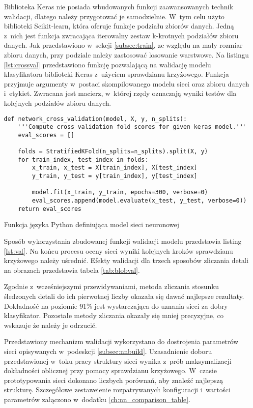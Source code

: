 Biblioteka Keras nie posiada wbudowanych funkcji zaawansowanych technik
walidacji, dlatego należy przygotować je samodzielnie.
W~tym celu użyto biblioteki Scikit-learn, która oferuje funkcje podziału
zbiorów danych.
Jedną z~nich jest funkcja zwracająca iterowalny zestaw k-krotnych
podziałów zbioru danych.
Jak przedstawiono w~sekcji \ref{subsec:train}, ze względu na mały rozmiar
zbioru danych, przy podziale należy zastosować losowanie warstwowe.
Na listingu \ref{lst:crossval} przedstawiono funkcję pozwalającą na walidację
modelu klasyfikatora biblioteki Keras z~użyciem sprawdzianu krzyżowego.
Funkcja przyjmuje argumenty w~postaci skompilowanego modelu sieci oraz
zbioru danych i~etykiet.
Zwracana jest macierz, w~której rzędy oznaczają wyniki testów dla kolejnych
podziałów zbioru danych.
\begin{listing}[htb]
\begin{verbatim}
def network_cross_validation(model, X, y, n_splits):
    '''Compute cross validation fold scores for given keras model.'''
    eval_scores = []

    folds = StratifiedKFold(n_splits=n_splits).split(X, y)
    for train_index, test_index in folds:
        x_train, x_test = X[train_index], X[test_index]
        y_train, y_test = y[train_index], y[test_index]

        model.fit(x_train, y_train, epochs=300, verbose=0)
        eval_scores.append(model.evaluate(x_test, y_test, verbose=0))
    return eval_scores
\end{verbatim}
\caption{Funkcja języka Python definiująca model sieci neuronowej}
\label{lst:crossval}
\end{listing}
Sposób wykorzystania zbudowanej funkcji walidacji modelu przedstawia
listing \ref{lst:val}.
Na końcu procesu oceny sieci wyniki kolejnych kroków sprawdzianu krzyżowego
należy uśrednić.
Efekty walidacji dla trzech sposobów zliczania detali na obrazach przedstawia
tabela \ref{tab:blobval}.

Zgodnie z~wcześniejszymi przewidywaniami, metoda zliczania stosunku śledzonych
detali do ich pierwotnej liczby okazała się dawać najlepsze rezultaty.
Dokładność na poziomie 91\% jest wystarczająca do uznania sieci za dobry
klasyfikator.
Pozostałe metody zliczania okazały się mniej precyzyjne, co wskazuje że należy
je odrzucić.

Przedstawiony mechanizm walidacji wykorzystano do dostrojenia parametrów
sieci opisywanych w~podeskcji \ref{subsec:nnbuild}.
Uzasadnienie doboru przedstawionej w~toku pracy struktury sieci wynika z~prób
maksymalizacji dokładności oblicznej przy pomocy sprawdzianu krzyżowego.
W~czasie prototypowania sieci dokonano liczbych porównań, aby znaleźć
najlepszą strukturę.
Szczegółowe zestaweienie rozpatrywanych konfiguracji i~wartości parametrów
załączono w~dodatku \ref{ch:nn_comparison_table}.

